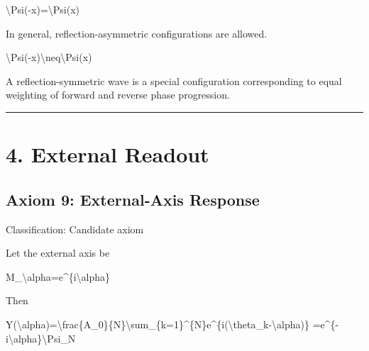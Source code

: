 \documentclass[
  a4paper]{article}
\newenvironment{Shaded}{}{}
\newcommand{\NormalTok}[1]{#1}
\begin{document}
\begin{Shaded}
\begin{Highlighting}[]
\NormalTok{\textbackslash{}Psi({-}x)=\textbackslash{}Psi(x)}
\end{Highlighting}
\end{Shaded}

In general, reflection-asymmetric configurations are allowed.

\begin{Shaded}
\begin{Highlighting}[]
\NormalTok{\textbackslash{}Psi({-}x)\textbackslash{}neq\textbackslash{}Psi(x)}
\end{Highlighting}
\end{Shaded}

A reflection-symmetric wave is a special configuration corresponding to
equal weighting of forward and reverse phase progression.

\begin{center}\rule{0.5\linewidth}{0.5pt}\end{center}

\section{4. External Readout}\label{external-readout}

\subsection{Axiom 9: External-Axis
Response}\label{axiom-9-external-axis-response}

Classification: Candidate axiom

Let the external axis be

\begin{Shaded}
\begin{Highlighting}[]
\NormalTok{M\_\textbackslash{}alpha=e\^{}\{i\textbackslash{}alpha\}}
\end{Highlighting}
\end{Shaded}

Then

\begin{Shaded}
\begin{Highlighting}[]
\NormalTok{Y(\textbackslash{}alpha)=\textbackslash{}frac\{A\_0\}\{N\}\textbackslash{}sum\_\{k=1\}\^{}\{N\}e\^{}\{i(\textbackslash{}theta\_k{-}\textbackslash{}alpha)\}}
\NormalTok{=e\^{}\{{-}i\textbackslash{}alpha\}\textbackslash{}Psi\_N}
\end{Highlighting}
\end{Shaded}
\end{document}
